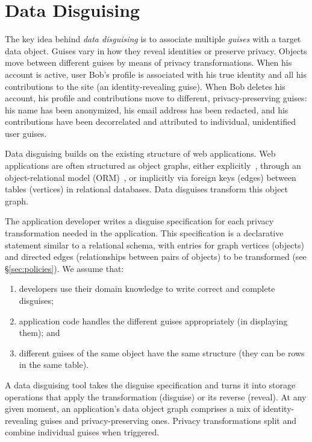 \section{Data Disguising}


The key idea behind \emph{data disguising} is to associate multiple \emph{guises} with a target
data object. Guises vary in how they reveal identities or preserve privacy.
%
Objects move between different guises by means of privacy transformations.
%
%
When his account is active, user Bob's profile is associated with his true identity and all his
contributions to the site (an identity-revealing guise).
%
When Bob deletes his account, his profile and contributions move to different, privacy-preserving
guises: his name has been anonymized, his email address has been redacted, and his contributions
have been decorrelated and attributed to individual, unidentified user guises.
%

%
Data disguising builds on the existing structure of web applications.
%
Web applications are often structured as object graphs, either explicitly~\cite{tao, delf},
through an object-relational model (ORM)~\cite{orm}, or implicitly via foreign keys (edges)
between tables (vertices) in relational databases.
%
Data disguises transform this object graph.
%

%
The application developer writes a disguise specification for each privacy transformation needed
in the application.
%
This specification is a declarative statement similar to a relational schema, with entries for
graph vertices (objects) and directed edges (relationships between pairs of objects)
to be transformed (see \S\ref{sec:policies}).
%
We assume that:
\begin{enumerate}[nosep]
  \item developers use their domain knowledge to write correct and complete disguises;
  \item application code handles the different guises appropriately (\eg in
    displaying them); and
  \item different guises of the same object have the same structure (\eg they can be
    rows in the same table).
\end{enumerate}
%
A data disguising tool takes the disguise specification and turns it into storage operations that
apply the transformation (disguise) or its reverse (reveal).
%
At any given moment, an application's data object graph comprises a mix of
identity-revealing guises and privacy-preserving ones. Privacy transformations split
and combine individual guises when triggered.

